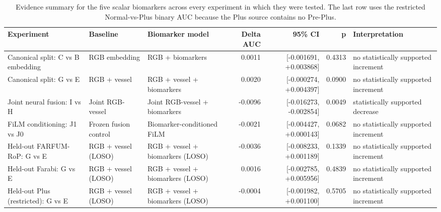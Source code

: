 \begin{table}[htbp]
\centering
\small
\caption{Evidence summary for the five scalar biomarkers across every experiment in which they were tested. The last row uses the restricted Normal-vs-Plus binary AUC because the Plus source contains no Pre-Plus.}
\label{tab:biomarkers}
\begin{tabular}{p{4.4cm}p{3.0cm}p{3.4cm}rrrp{3.2cm}}
\toprule
Experiment & Baseline & Biomarker model & Delta AUC & 95\% CI & p & Interpretation \\
\midrule
Canonical split: C vs B embedding & RGB embedding & RGB + biomarkers & 0.0011 & [-0.001691, +0.003868] & 0.4313 & no statistically supported increment \\
Canonical split: G vs E & RGB + vessel & RGB + vessel + biomarkers & 0.0020 & [-0.000274, +0.004397] & 0.0900 & no statistically supported increment \\
Joint neural fusion: I vs H & Joint RGB-vessel & Joint RGB-vessel + biomarkers & -0.0096 & [-0.016273, -0.002854] & 0.0049 & statistically supported decrease \\
FiLM conditioning: J1 vs J0 & Frozen fusion control & Biomarker-conditioned FiLM & -0.0021 & [-0.004427, +0.000143] & 0.0682 & no statistically supported increment \\
Held-out FARFUM-RoP: G vs E & RGB + vessel (LOSO) & RGB + vessel + biomarkers (LOSO) & -0.0036 & [-0.008233, +0.001189] & 0.1339 & no statistically supported increment \\
Held-out Farabi: G vs E & RGB + vessel (LOSO) & RGB + vessel + biomarkers (LOSO) & 0.0016 & [-0.002785, +0.005956] & 0.4839 & no statistically supported increment \\
Held-out Plus (restricted): G vs E & RGB + vessel (LOSO) & RGB + vessel + biomarkers (LOSO) & -0.0004 & [-0.001982, +0.001100] & 0.5705 & no statistically supported increment \\
\bottomrule
\end{tabular}
\end{table}
